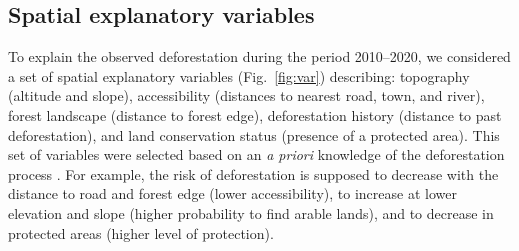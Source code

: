 \documentclass[
  12pt,
]{article}
\begin{document}
\hypertarget{spatial-explanatory-variables}{%
\subsection{Spatial explanatory variables}\label{spatial-explanatory-variables}}

To explain the observed deforestation during the period 2010--2020, we considered a set of spatial explanatory variables (Fig.~\ref{fig:var}) describing: topography (altitude and slope), accessibility (distances to nearest road, town, and river), forest landscape (distance to forest edge), deforestation history (distance to past deforestation), and land conservation status (presence of a protected area). This set of variables were selected based on an \emph{a priori} knowledge of the deforestation process \citep{Geist2002, Vieilledent2013, Brown1994}. For example, the risk of deforestation is supposed to decrease with the distance to road and forest edge (lower accessibility), to increase at lower elevation and slope (higher probability to find arable lands), and to decrease in protected areas (higher level of protection).\\
\end{document}
